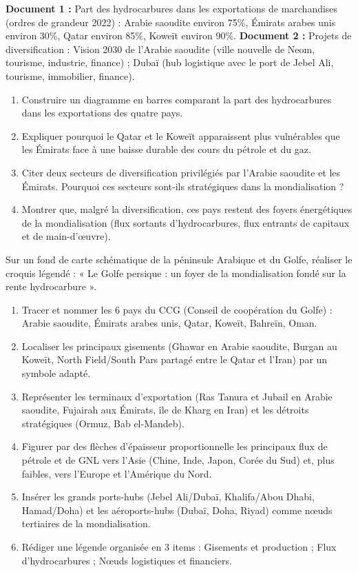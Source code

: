 \documentclass[11pt]{article}
\begin{document}
\begin{exercice}
\textbf{Document 1 :} Part des hydrocarbures dans les exportations de marchandises (ordres de grandeur 2022) : Arabie saoudite environ 75\%, Émirats arabes unis environ 30\%, Qatar environ 85\%, Koweït environ 90\%.
\textbf{Document 2 :} Projets de diversification : Vision 2030 de l'Arabie saoudite (ville nouvelle de Neom, tourisme, industrie, finance) ; Dubaï (hub logistique avec le port de Jebel Ali, tourisme, immobilier, finance).
\begin{enumerate}
\item Construire un diagramme en barres comparant la part des hydrocarbures dans les exportations des quatre pays.
\item Expliquer pourquoi le Qatar et le Koweït apparaissent plus vulnérables que les Émirats face à une baisse durable des cours du pétrole et du gaz.
\item Citer deux secteurs de diversification privilégiés par l'Arabie saoudite et les Émirats. Pourquoi ces secteurs sont-ils stratégiques dans la mondialisation ?
\item Montrer que, malgré la diversification, ces pays restent des foyers énergétiques de la mondialisation (flux sortants d'hydrocarbures, flux entrants de capitaux et de main-d'œuvre).
\end{enumerate}
\end{exercice}

\begin{exercice}
Sur un fond de carte schématique de la péninsule Arabique et du Golfe, réaliser le croquis légendé : « Le Golfe persique : un foyer de la mondialisation fondé sur la rente hydrocarbure ».
\begin{enumerate}
\item Tracer et nommer les 6 pays du CCG (Conseil de coopération du Golfe) : Arabie saoudite, Émirats arabes unis, Qatar, Koweït, Bahreïn, Oman.
\item Localiser les principaux gisements (Ghawar en Arabie saoudite, Burgan au Koweït, North Field/South Pars partagé entre le Qatar et l'Iran) par un symbole adapté.
\item Représenter les terminaux d'exportation (Ras Tanura et Jubail en Arabie saoudite, Fujairah aux Émirats, île de Kharg en Iran) et les détroits stratégiques (Ormuz, Bab el-Mandeb).
\item Figurer par des flèches d'épaisseur proportionnelle les principaux flux de pétrole et de GNL vers l'Asie (Chine, Inde, Japon, Corée du Sud) et, plus faibles, vers l'Europe et l'Amérique du Nord.
\item Insérer les grands ports-hubs (Jebel Ali/Dubaï, Khalifa/Abou Dhabi, Hamad/Doha) et les aéroports-hubs (Dubaï, Doha, Riyad) comme nœuds tertiaires de la mondialisation.
\item Rédiger une légende organisée en 3 items : Gisements et production ; Flux d'hydrocarbures ; Nœuds logistiques et financiers.
\end{enumerate}
\end{exercice}
\end{document}
